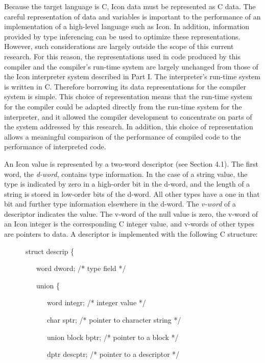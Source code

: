 Because the target language is C, Icon data must be represented as C
data. The careful representation of data and variables is important to
the performance of an implementation of a high-level language such as
Icon. In addition, information provided by type inferencing can be
used to optimize these representations. However, such considerations
are largely outside the scope of this current research. For this
reason, the representations used in code produced by this compiler and
the compiler's run-time system are largely unchanged from those of the
Icon interpreter system described in Part I. The interpreter's
run-time system is written in C. Therefore borrowing its data
representations for the compiler system is simple. This choice of
representation means that the run-time system for the compiler could
be adapted directly from the run-time system for the interpreter, and
it allowed the compiler development to concentrate on parts of the
system addressed by this research. In addition, this choice of
representation allows a meaningful comparison of the performance of
compiled code to the performance of interpreted code.


An Icon value is represented by a two-word descriptor (see Section
4.1). The first word, the \textit{d-word}, contains type
information. In the case of a string value, the type is indicated by
zero in a high-order bit in the d-word, and the length of a string is
stored in low-order bits of the d-word. All other types have a one in
that bit and further type information elsewhere in the d-word. The
\textit{v-word} of a descriptor indicates the value. The v-word of the
null value is zero, the v-word of an Icon integer is the corresponding
C integer value, and v-words of other types are pointers to data. A
descriptor is implemented with the following C structure:

{\ttfamily\mdseries
\ \ \ \ \ \ struct descrip \{}

{\ttfamily\mdseries
\ \ \ \ \ \ \ \ \ word dword; /* type field */}

{\ttfamily\mdseries
\ \ \ \ \ \ \ \ \ union \{}

{\ttfamily\mdseries
\ \ \ \ \ \ \ \ \ \ \ \ word integr; /* integer value */}

{\ttfamily\mdseries
\ \ \ \ \ \ \ \ \ \ \ \ char sptr; /* pointer to character string */}

{\ttfamily\mdseries
\ \ \ \ \ \ \ \ \ \ \ \ union block bptr; /* pointer to a block */}

{\ttfamily\mdseries
\ \ \ \ \ \ \ \ \ \ \ \ dptr descptr; /* pointer to a descriptor */}

